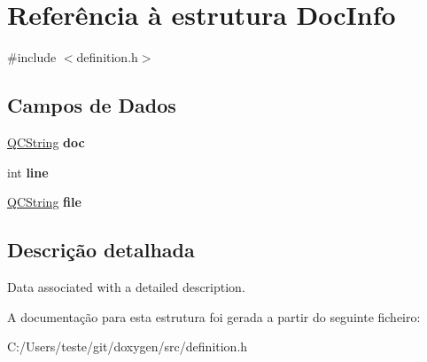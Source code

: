 \hypertarget{struct_doc_info}{\section{Referência à estrutura Doc\-Info}
\label{struct_doc_info}
}


{\ttfamily \#include $<$definition.\-h$>$}

\subsection*{Campos de Dados}
\begin{DoxyCompactItemize}
\item 
\hypertarget{struct_doc_info_a9910424bf5401d657c3b3fdff6fcc152}{\hyperlink{class_q_c_string}{Q\-C\-String} {\bfseries doc}}\label{struct_doc_info_a9910424bf5401d657c3b3fdff6fcc152}

\item 
\hypertarget{struct_doc_info_a41ebd28ef1d7c6ade45642cb6acc1039}{int {\bfseries line}}\label{struct_doc_info_a41ebd28ef1d7c6ade45642cb6acc1039}

\item 
\hypertarget{struct_doc_info_afeb3e9dc965e44d291bbce99ea8dbcc7}{\hyperlink{class_q_c_string}{Q\-C\-String} {\bfseries file}}\label{struct_doc_info_afeb3e9dc965e44d291bbce99ea8dbcc7}

\end{DoxyCompactItemize}


\subsection{Descrição detalhada}
Data associated with a detailed description. 

A documentação para esta estrutura foi gerada a partir do seguinte ficheiro\-:\begin{DoxyCompactItemize}
\item 
C\-:/\-Users/teste/git/doxygen/src/definition.\-h\end{DoxyCompactItemize}
